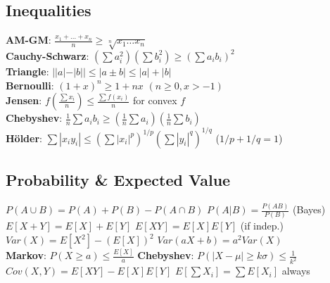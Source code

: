 \subsection{Inequalities}
\textbf{AM-GM}: $\frac{x_1 + \dots + x_n}{n} \ge \sqrt[n]{x_1 \dots x_n}$ \\
\textbf{Cauchy-Schwarz}: $(\sum a_i^2)(\sum b_i^2) \ge (\sum a_i b_i)^2$ \\
\textbf{Triangle}: $||a| - |b|| \le |a \pm b| \le |a| + |b|$ \\
\textbf{Bernoulli}: $(1 + x)^n \ge 1 + nx$ $(n \ge 0, x > -1)$ \\
\textbf{Jensen}: $f(\frac{\sum x_i}{n}) \le \frac{\sum f(x_i)}{n}$ for convex $f$ \\
\textbf{Chebyshev}: $\frac{1}{n} \sum a_i b_i \ge (\frac{1}{n} \sum a_i)(\frac{1}{n} \sum b_i)$ \\
\textbf{Hölder}: $\sum |x_i y_i| \le (\sum |x_i|^p)^{1/p} (\sum |y_i|^q)^{1/q}$ ($1/p + 1/q = 1$)

\subsection{Probability \& Expected Value}
$P(A \cup B) = P(A) + P(B) - P(A \cap B)$ \hfill $P(A|B) = \frac{P(AB)}{P(B)}$ (Bayes) \\
$E[X + Y] = E[X] + E[Y]$ \hfill $E[XY] = E[X]E[Y]$ (if indep.) \\
$Var(X) = E[X^2] - (E[X])^2$ \hfill $Var(aX + b) = a^2 Var(X)$ \\
\textbf{Markov}: $P(X \ge a) \le \frac{E[X]}{a}$ \hfill \textbf{Chebyshev}: $P(|X - \mu| \ge k\sigma) \le \frac{1}{k^2}$ \\
$Cov(X, Y) = E[XY] - E[X]E[Y]$ \hfill $E[\sum X_i] = \sum E[X_i]$ always

